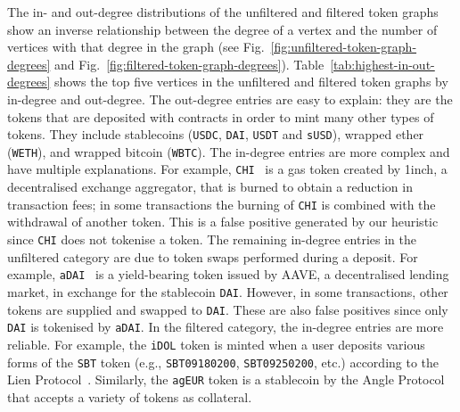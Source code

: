 The in- and out-degree distributions of the unfiltered and filtered
token graphs show an inverse relationship between the degree of a
vertex and the number of vertices with that degree in the graph (see
Fig.~\ref{fig:unfiltered-token-graph-degrees} and
Fig.~\ref{fig:filtered-token-graph-degrees}).
Table~\ref{tab:highest-in-out-degrees} shows the top five vertices in
the unfiltered and filtered token graphs by in-degree and out-degree.
The out-degree entries are easy to explain: they are the tokens that
are deposited with contracts in order to mint many other types of
tokens.  They include stablecoins (\texttt{USDC}, \texttt{DAI},
\texttt{USDT} and \texttt{sUSD}), wrapped ether (\texttt{WETH}), and
wrapped bitcoin (\texttt{WBTC}).  The in-degree entries are more
complex and have multiple explanations.  For example,
\texttt{CHI}~\cite{1inch-20} is a gas token created by 1inch, a
decentralised exchange aggregator, that is burned to obtain a
reduction in transaction fees; in some transactions the burning of
\texttt{CHI} is combined with the withdrawal of another token.  This
is a false positive generated by our heuristic since \texttt{CHI} does
not tokenise a token.  The remaining in-degree entries in the
unfiltered category are due to token swaps performed during a deposit.
For example, \texttt{aDAI}~\cite{aave-xx} is a yield-bearing token
issued by AAVE, a decentralised lending market, in exchange for the
stablecoin \texttt{DAI}.  However, in some transactions, other tokens
are supplied and swapped to \texttt{DAI}.  These are also false
positives since only \texttt{DAI} is tokenised by \texttt{aDAI}.  In
the filtered category, the in-degree entries are more reliable.  For
example, the \texttt{iDOL} token is minted when a user deposits
various forms of the \texttt{SBT} token (e.g., \texttt{SBT09180200},
\texttt{SBT09250200}, etc.) according to the Lien
Protocol~\cite{lien-20}.  Similarly, the \texttt{agEUR} token is a
stablecoin by the Angle Protocol~\cite{angle-xx} that accepts a
variety of tokens as collateral.

